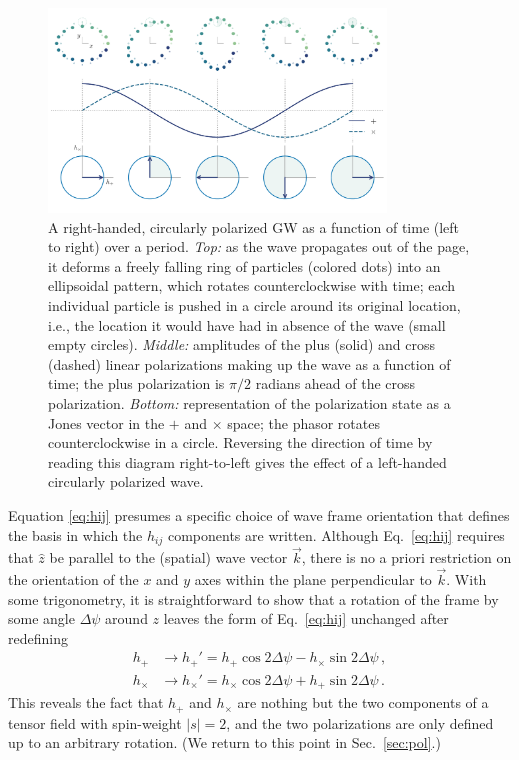 \documentclass[aps,prd,twocolumn,superscriptaddress,preprintnumbers,floatfix,nofootinbib]{revtex4-2}
\newcommand*{\eq}[1]{Eq.~\eqref{eq:#1}}
\begin{document}
\begin{figure}
\includegraphics[width=0.8\textwidth]{pol_diagram_circ}
\caption{A right-handed, circularly polarized GW as a function of time (left to right) over a period. \emph{Top:} as the wave propagates out of the page, it deforms a freely falling ring of particles (colored dots) into an ellipsoidal pattern, which rotates counterclockwise with time; each individual particle is pushed in a circle around its original location, i.e., the location it would have had in absence of the wave (small empty circles).
\emph{Middle:} amplitudes of the plus (solid) and cross (dashed) linear polarizations making up the wave as a function of time; the plus polarization is $\pi/2$ radians ahead of the cross polarization.
\emph{Bottom:} representation of the polarization state as a Jones vector in the $+$ and $\times$ space; the phasor rotates counterclockwise in a circle.
Reversing the direction of time by reading this diagram right-to-left gives the effect of a left-handed circularly polarized wave.
}
\label{fig:pol_diagram_circ}
\end{figure}

Equation \eqref{eq:hij} presumes a specific choice of wave frame orientation that defines the basis in which the $h_{ij}$ components are written.
Although \eq{hij} requires that $\hat{z}$ be parallel to the (spatial) wave vector $\vec{k}$, there is no a priori restriction on the orientation of the $x$ and $y$ axes within the plane perpendicular to $\vec{k}$.
With some trigonometry, it is straightforward to show that a rotation of the frame by some angle $\Delta \psi$ around $z$ leaves the form of \eq{hij} unchanged after redefining
\begin{subequations} \label{eq:htransf}
\begin{align}
h_+ &\rightarrow h_+' = h_+ \cos 2\Delta \psi - h_\times \sin 2\Delta\psi \, , \\
h_\times &\rightarrow h_\times' = h_\times \cos 2\Delta \psi + h_+ \sin 2\Delta\psi \, .
\end{align}
\end{subequations}
This reveals the fact that $h_+$ and $h_\times$ are nothing but the two components of a tensor field with spin-weight $|s|=2$, and the two polarizations are only defined up to an arbitrary rotation.
(We return to this point in Sec.~\ref{sec:pol}.)
\end{document}
